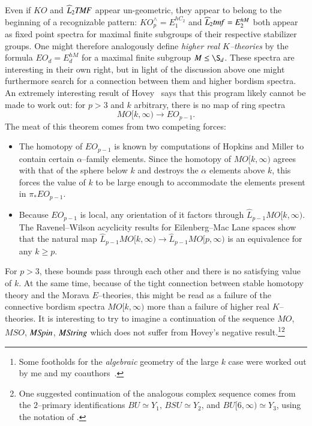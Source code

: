 Even if $KO$ and $\widehat L_2 \mathit{TMF}$ appear un-geometric, they appear to belong to the beginning of a recognizable pattern: $KO^\wedge_p = E_1^{hC_2}$ and $\widehat L_2 \mathit{tmf} = E_2^{hM}$ both appear as fixed point spectra for maximal finite subgroups of their respective stabilizer groups.  One might therefore analogously define \textit{higher real $K$--theories} by the formula $EO_d = E_d^{hM}$ for a maximal finite subgroup $M \le \S_d$.  These spectra are interesting in their own right, but in light of the discussion above one might furthermore search for a connection between them and higher bordism spectra.  An extremely interesting result of Hovey~\cite[Proposition 2.3.4]{HoveyVnEltsOfRings} says that this program likely cannot be made to work out: for $p > 3$ and $k$ arbitrary, there is no map of ring spectra \[MO[k, \infty) \to EO_{p-1}.\]  The meat of this theorem comes from two competing forces:
\begin{itemize}
    \item The homotopy of $EO_{p-1}$ is known by computations of Hopkins and Miller to contain certain $\alpha$--family elements.  Since the homotopy of $MO[k, \infty)$ agrees with that of the sphere below $k$ and destroys the $\alpha$ elements above $k$, this forces the value of $k$ to be large enough to accommodate the elements present in $\pi_* EO_{p-1}$.
    \item Because $EO_{p-1}$ is local, any orientation of it factors through $\widehat L_{p-1} MO[k, \infty)$.  The Ravenel--Wilson acyclicity results for Eilenberg--Mac Lane spaces show that the natural map $\widehat L_{p-1} MO[k, \infty) \to \widehat L_{p-1} MO[p, \infty)$ is an equivalence for any $k \ge p$.
\end{itemize}
For $p > 3$, these bounds pass through each other and there is no satisfying value of $k$.  At the same time, because of the tight connection between stable homotopy theory and the Morava $E$--theories, this might be read as a failure of the connective bordism spectra $MO[k, \infty)$ more than a failure of higher real $K$--theories.  It is interesting to try to imagine a continuation of the sequence $MO$, $MSO$, $M\mathit{Spin}$, $M\mathit{String}$ which does not suffer from Hovey's negative result.\footnote{Some footholds for the \emph{algebraic} geometry of the large $k$ case were worked out by me and my coauthors~\cite{HLP}.}\footnote{One suggested continuation of the analogous complex sequence comes from the $2$--primary identifications $BU \simeq Y_1$, $BSU \simeq Y_2$, and $BU[6, \infty) \simeq Y_3$, using the notation of .}








